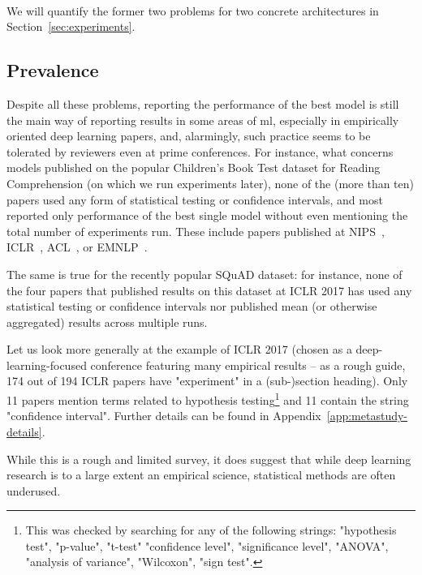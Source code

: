 \documentclass{article}
\newcommand{\ml}{\gls{ml}\xspace}
\newcommand{\dl}{deep learning\xspace}
\begin{document}
\


We will quantify the former two problems for two concrete architectures in Section~\ref{sec:experiments}. 


\subsection{Prevalence}

Despite all these problems, reporting the performance of the best model is still the main way of reporting results in some areas of \ml, especially in empirically oriented \dl papers, and, alarmingly, such practice seems to be tolerated by reviewers even at prime conferences. For instance, what concerns models published on the popular Children's Book Test dataset for Reading Comprehension (on which we run experiments later), none of the (more than ten) papers used any form of statistical testing or confidence intervals, and most reported only performance of the best single model without even mentioning the total number of experiments run.
These include papers published at NIPS~\citep{hermann2015teaching}, ICLR~\citep{hill2015goldilocks, munkhdalai2016reasoning}, ACL~\citep{chen2016thorough, Dhingra2016, Cui2016}, or EMNLP~\citep{Trischler2016a}.  

The same is true for the recently popular SQuAD dataset: for instance, none of the four papers \citep{yang2016words,wang2016machine,seo2016bidirectional,xiong2016dynamic} that published results on this dataset at ICLR 2017 has used any statistical testing or confidence intervals nor published mean (or otherwise aggregated) results across multiple runs. 

Let us look more generally at the example of ICLR 2017 (chosen as a deep-learning-focused conference featuring many empirical results -- as a rough guide, 174 out of 194 ICLR papers have "experiment" in a (sub-)section heading). Only 11 papers mention terms related to hypothesis testing\footnote{This was checked by searching for any of the following strings: "hypothesis test", "p-value", "t-test" "confidence level", "significance level", "ANOVA", "analysis of variance", "Wilcoxon", "sign test".} and 11 contain the string "confidence interval". Further details can be found in Appendix~\ref{app:metastudy-details}.

While this is a rough and limited survey, it does suggest that while \dl research is to a large extent an empirical science, statistical methods are often underused.
\end{document}

